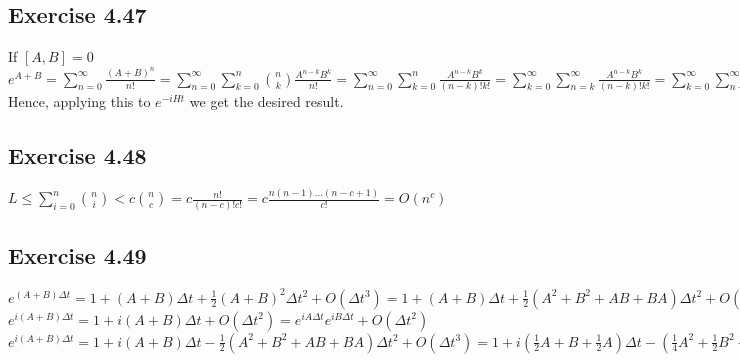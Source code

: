 \documentclass[a4paper,12pt]{article}
\begin{document}
\subsection*{Exercise 4.47}
If $[A,B]=0$\\
$e^{A+B}=\displaystyle\sum_{n=0}^\infty\frac{(A+B)^n}{n!}=
\displaystyle\sum_{n=0}^\infty\sum_{k=0}^n{n\choose k}\frac{A^{n-k}B^k}{n!}=
\displaystyle\sum_{n=0}^\infty\sum_{k=0}^{n}\frac{A^{n-k}B^k}{(n-k)!k!}=
\displaystyle\sum_{k=0}^\infty\sum_{n=k}^\infty\frac{A^{n-k}B^k}{(n-k)!k!}=
\displaystyle\sum_{k=0}^\infty\sum_{n-k=0}^\infty\frac{A^{n-k}B^k}{(n-k)!k!}=
e^{A}e^{B}$\\
Hence, applying this to $e^{-iHt}$ we get the desired result.
\subsection*{Exercise 4.48}
$L\leq\displaystyle\sum_{i=0}^n{n\choose i}<c{n\choose c}=
c\displaystyle\frac{n!}{(n-c)!c!}=c\displaystyle\frac{n(n-1)\ldots(n-c+1)}{c!}=O(n^c)$
\subsection*{Exercise 4.49}
$e^{(A+B)\Delta t}=1+(A+B)\Delta t+\frac{1}{2}(A+B)^2\Delta t^2+O(\Delta t^3)=
1+(A+B)\Delta t+\frac{1}{2}(A^2+B^2+AB+BA)\Delta t^2+O(\Delta t^3)=
1+(A+B)\Delta t+\frac{1}{2}(A^2+B^2+2AB-(AB-BA))\Delta t^2+O(\Delta t^3)=
e^{A\Delta t}e^{B\Delta t}e^{-\frac{1}{2}[A,B]\Delta t^2}+O(\Delta t^3)$\\
$e^{i(A+B)\Delta t}=1+i(A+B)\Delta t +O(\Delta t^2)=e^{iA\Delta t}e^{iB\Delta t}+O(\Delta t^2)$\\
$e^{i(A+B)\Delta t}=1+i(A+B)\Delta t-\frac{1}{2}(A^2+B^2+AB+BA)\Delta t^2+
O(\Delta t^3)=1+i(\frac{1}{2}A+B+\frac{1}{2}A)\Delta t-(\frac{1}{4}A^2+\frac{1}{2}B^2+\frac{1}{4}AB+\frac{1}{4}BA)\Delta t^2+
O(\Delta t^3)=e^{iA\Delta t/2}e^{iB\Delta t}e^{A\Delta t/2}+O(\Delta t^3)$
\end{document}
